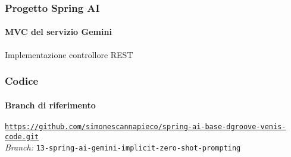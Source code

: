 %
\begin{frame}[t,fragile] \frametitle{Progetto Spring AI}
    \framesubtitle{MVC del servizio Gemini}
    	\vspace*{-.7cm}
        \begin{block}{Implementazione controllore REST}
			{\tiny}
    	\end{block}
\end{frame}
%
\begin{frame}[fragile] \frametitle{Codice}
    \framesubtitle{Branch di riferimento}
	\begin{center}
		{\scriptsize \href{https://github.com/simonescannapieco/spring-ai-base-dgroove-venis-code.git}{\texttt{https://github.com/simonescannapieco/spring-ai-base-dgroove-venis-code.git}}}\\
		\textit{Branch:} \alert{\texttt{13-spring-ai-gemini-implicit-zero-shot-prompting}}
	\end{center}
\end{frame}